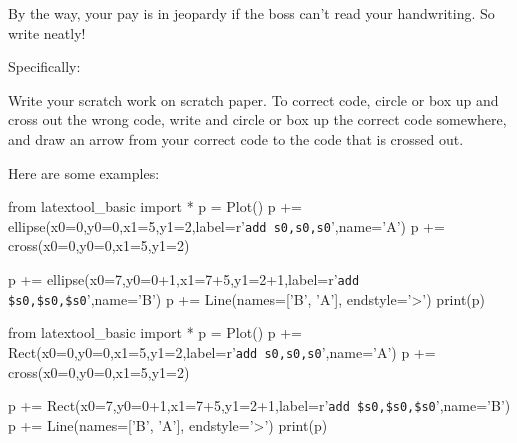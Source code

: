 By the way, your pay
is in jeopardy if the boss can't read your handwriting.
So write neatly!

Specifically:
\begin{itemize}
\li Write your scratch work on scratch paper. 
\li To correct code, circle or box up and cross out the wrong code, write and circle or box up the correct code somewhere, and draw an arrow from your correct code to the code that is crossed out.
\end{itemize}
Here are some examples:
\begin{python}
from latextool_basic import *
p = Plot()
p += ellipse(x0=0,y0=0,x1=5,y1=2,label=r'\texttt{add s0,s0,s0}',name='A')
p += cross(x0=0,y0=0,x1=5,y1=2)

p += ellipse(x0=7,y0=0+1,x1=7+5,y1=2+1,label=r'\texttt{add \$s0,\$s0,\$s0}',name='B')
p += Line(names=['B', 'A'], endstyle='>')
print(p)
\end{python}
\begin{python}
from latextool_basic import *
p = Plot()
p += Rect(x0=0,y0=0,x1=5,y1=2,label=r'\texttt{add s0,s0,s0}',name='A')
p += cross(x0=0,y0=0,x1=5,y1=2)

p += Rect(x0=7,y0=0+1,x1=7+5,y1=2+1,label=r'\texttt{add \$s0,\$s0,\$s0}',name='B')
p += Line(names=['B', 'A'], endstyle='>')
print(p)
\end{python}
